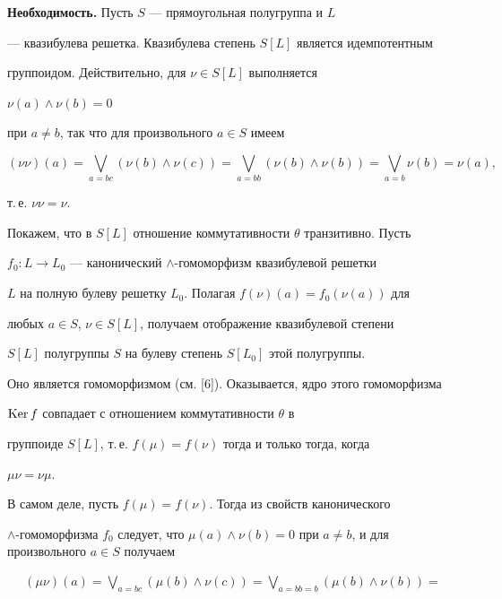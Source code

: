 \begin{pf}


{\bf Необходимость.} Пусть $S$ --- прямоугольная полугруппа и $L$


--- квазибулева решетка. Квазибулева степень $S[L]$ является идемпотентным


группоидом. Действительно, для $\nu\in S[L]$ выполняется


$\nu(a)\wedge\nu(b)=0$


при $a\ne b$, так что для произвольного $a\in S$ имеем


$$


(\nu\nu)(a)=\bigvee_{a=bc}(\nu(b)\wedge\nu(c))=


\bigvee_{a=bb}(\nu(b)\wedge\nu(b))=\bigvee_{a=b}\nu(b)=\nu(a),


$$


т.\,е. $\nu\nu=\nu$.





Покажем, что в $S[L]$ отношение коммутативности $\theta$ транзитивно. Пусть


$f_0: L\to L_0$ --- канонический $\wedge$-гомоморфизм квазибулевой решетки


$L$ на полную булеву решетку $L_0$. Полагая $f(\nu)(a)=f_0(\nu(a))$ для


любых $a\in S$, $\nu\in S[L]$, получаем отображение квазибулевой степени


$S[L]$ полугруппы $S$ на булеву степень $S[L_0]$ этой полугруппы.


Оно является гомоморфизмом (см. [6]). Оказывается, ядро этого гомоморфизма


$\operatorname{Ker} f$ совпадает с отношением коммутативности $\theta$ в


группоиде $S[L]$, т.\,е. $f(\mu)=f(\nu)$ тогда и только тогда, когда


$\mu\nu=\nu\mu$.





В самом деле, пусть $f(\mu)=f(\nu)$. Тогда из свойств канонического


$\wedge$-гомоморфизма $f_0$ следует, что $\mu(a)\wedge\nu(b)=0$ при $a\ne


b$, и для произвольного $a\in S$ получаем


\begin{multline*}


(\mu\nu)(a)=\bigvee_{a=bc}(\mu(b)\wedge\nu(c))=


\bigvee_{a=bb=b}(\mu(b)\wedge\nu(b))=\\



\end{multline*}
\end{pf}
